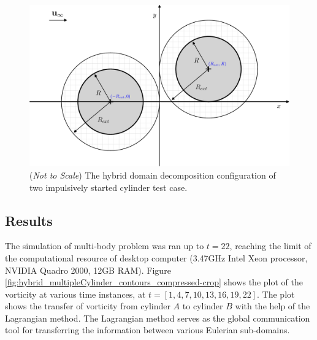 	\begin{figure}[H]
	\centering
	\includegraphics[width=0.6\linewidth]{./figures/validation/multipleCylinder/hmisc_dd-crop.pdf}
	\caption{(\textit{Not to Scale}) The hybrid domain decomposition configuration of two impulsively started cylinder test case. }
	\label{fig:hmisc_dd-crop}
	\end{figure}

\subsection{Results}

The simulation of multi-body problem was ran up to $t=22$, reaching the limit of the computational resource of desktop computer (3.47GHz Intel Xeon processor, NVIDIA Quadro 2000, 12GB RAM). Figure \ref{fig:hybrid_multipleCylinder_contours_compressed-crop} shows the plot of the vorticity at various time instances, at $t=[1,4,7,10,13,16,19,22]$. The plot shows the transfer of vorticity from cylinder $A$ to cylinder $B$ with the help of the Lagrangian method. The Lagrangian method serves as the global communication tool for transferring the information between various Eulerian sub-domains. 

